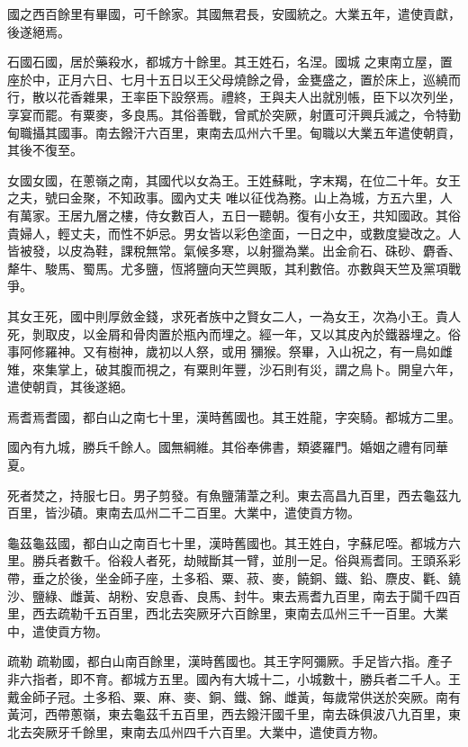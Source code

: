 \begin{pinyinscope}
 國之西百餘里有畢國，可千餘家。其國無君長，安國統之。大業五年，遣使貢獻，後遂絕焉。



 石國石國，居於藥殺水，都城方十餘里。其王姓石，名涅。國城
 之東南立屋，置座於中，正月六日、七月十五日以王父母燒餘之骨，金甕盛之，置於床上，巡繞而行，散以花香雜果，王率臣下設祭焉。禮終，王與夫人出就別帳，臣下以次列坐，享宴而罷。有粟麥，多良馬。其俗善戰，曾貳於突厥，射匱可汗興兵滅之，令特勤甸職攝其國事。南去鏺汗六百里，東南去瓜州六千里。甸職以大業五年遣使朝貢，其後不復至。



 女國女國，在蔥嶺之南，其國代以女為王。王姓蘇毗，字末羯，在位二十年。女王之夫，號曰金聚，不知政事。國內丈夫
 唯以征伐為務。山上為城，方五六里，人有萬家。王居九層之樓，侍女數百人，五日一聽朝。復有小女王，共知國政。其俗貴婦人，輕丈夫，而性不妒忌。男女皆以彩色塗面，一日之中，或數度變改之。人皆被發，以皮為鞋，課稅無常。氣候多寒，以射獵為業。出金俞石、硃砂、麝香、犛牛、駿馬、蜀馬。尤多鹽，恆將鹽向天竺興販，其利數倍。亦數與天竺及黨項戰爭。



 其女王死，國中則厚斂金錢，求死者族中之賢女二人，一為女王，次為小王。貴人死，剝取皮，以金屑和骨肉置於瓶內而埋之。經一年，又以其皮內於鐵器埋之。俗事阿修羅神。又有樹神，歲初以人祭，或用
 獼猴。祭畢，入山祝之，有一鳥如雌雉，來集掌上，破其腹而視之，有粟則年豐，沙石則有災，謂之鳥卜。開皇六年，遣使朝貢，其後遂絕。



 焉耆焉耆國，都白山之南七十里，漢時舊國也。其王姓龍，字突騎。都城方二里。



 國內有九城，勝兵千餘人。國無綱維。其俗奉佛書，類婆羅門。婚姻之禮有同華夏。



 死者焚之，持服七日。男子剪發。有魚鹽蒲葦之利。東去高昌九百里，西去龜茲九百里，皆沙磧。東南去瓜州二千二百里。大業中，遣使貢方物。



 龜茲龜茲國，都白山之南百七十里，漢時舊國也。其王姓白，字蘇尼咥。都城方六里。勝兵者數千。俗殺人者死，劫賊斷其一臂，並刖一足。俗與焉耆同。王頭系彩帶，垂之於後，坐金師子座，土多稻、粟、菽、麥，饒銅、鐵、鉛、麖皮、氍、鐃沙、鹽綠、雌黃、胡粉、安息香、良馬、封牛。東去焉耆九百里，南去于闐千四百里，西去疏勒千五百里，西北去突厥牙六百餘里，東南去瓜州三千一百里。大業中，遣使貢方物。



 疏勒
 疏勒國，都白山南百餘里，漢時舊國也。其王字阿彌厥。手足皆六指。產子非六指者，即不育。都城方五里。國內有大城十二，小城數十，勝兵者二千人。王戴金師子冠。土多稻、粟、麻、麥、銅、鐵、錦、雌黃，每歲常供送於突厥。南有黃河，西帶蔥嶺，東去龜茲千五百里，西去鏺汗國千里，南去硃俱波八九百里，東北去突厥牙千餘里，東南去瓜州四千六百里。大業中，遣使貢方物。




\end{pinyinscope}
